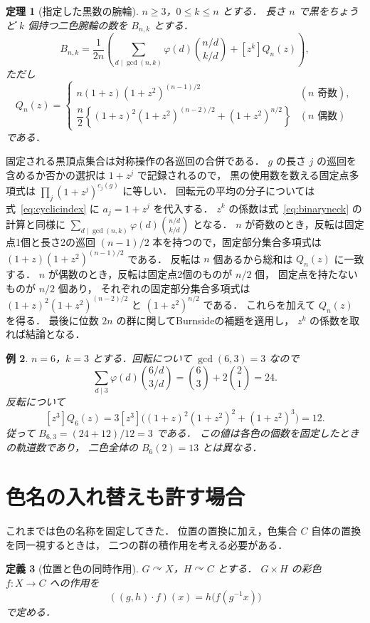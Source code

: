 \documentclass[a5paper,10pt,onecolumn]{jsarticle}
\makeatletter
\theoremstyle{mathnotetheorem}
\newtheorem{theorem}{定理}[section]
\newtheorem{definition}[theorem]{定義}
\newtheorem{example}[theorem]{例}
\renewcommand{\proofname}{証明}
\renewenvironment{proof}[1][\proofname]{%
  \par\pushQED{\qed}\normalfont\topsep4\p@\@plus2\p@\relax
  \trivlist\item[\hskip\labelsep\bfseries #1]\ignorespaces
}{\popQED\endtrivlist\@endpefalse}
\makeatother
\begin{document}
\begin{theorem}[指定した黒数の腕輪]\label{thm:fixedblackbracelet}
$n\ge3$，$0\le k\le n$ とする．
長さ $n$ で黒をちょうど $k$ 個持つ二色腕輪の数を $B_{n,k}$ とする．
\[
 B_{n,k}=\frac1{2n}\left(
 \sum_{d\mid\gcd(n,k)}\varphi(d){n/d\choose k/d}
 +[z^k]Q_n(z)\right),
\]
ただし
\[
 Q_n(z)=\begin{cases}
 n(1+z)(1+z^2)^{(n-1)/2}&(n\text{ 奇数}),\\
 \dfrac n2\left\{(1+z)^2(1+z^2)^{(n-2)/2}
 +(1+z^2)^{n/2}\right\}&(n\text{ 偶数})
 \end{cases}
\]
である．
\end{theorem}
\begin{proof}
固定される黒頂点集合は対称操作の各巡回の合併である．
$g$ の長さ $j$ の巡回を含めるか否かの選択は
$1+z^j$ で記録されるので，
黒の使用数を数える固定点多項式は
$\prod_j(1+z^j)^{c_j(g)}$ に等しい．
回転元の平均の分子については
式~\eqref{eq:cyclicindex} に $a_j=1+z^j$ を代入する．
$z^k$ の係数は式~\eqref{eq:binaryneck} の計算と同様に
$\sum_{d\mid\gcd(n,k)}\varphi(d){n/d\choose k/d}$ となる．
$n$ が奇数のとき，反転は固定点1個と長さ2の巡回
$(n-1)/2$ 本を持つので，固定部分集合多項式は
$(1+z)(1+z^2)^{(n-1)/2}$ である．
反転は $n$ 個あるから総和は $Q_n(z)$ に一致する．
$n$ が偶数のとき，反転は固定点2個のものが $n/2$ 個，
固定点を持たないものが $n/2$ 個あり，
それぞれの固定部分集合多項式は
$(1+z)^2(1+z^2)^{(n-2)/2}$ と
$(1+z^2)^{n/2}$ である．
これらを加えて $Q_n(z)$ を得る．
最後に位数 $2n$ の群に関してBurnsideの補題を適用し，
$z^k$ の係数を取れば結論となる．
\end{proof}

\begin{example}
$n=6$，$k=3$ とする．回転について
$\gcd(6,3)=3$ なので
\[
 \sum_{d\mid3}\varphi(d){6/d\choose3/d}
 ={6\choose3}+2{2\choose1}=24.
\]
反転について
\[
 [z^3]Q_6(z)
 =3[z^3]\bigl((1+z)^2(1+z^2)^2
 +(1+z^2)^3\bigr)=12.
\]
従って $B_{6,3}=(24+12)/12=3$ である．
この値は各色の個数を固定したときの軌道数であり，
二色全体の $B_6(2)=13$ とは異なる．
\end{example}

\section{色名の入れ替えも許す場合}
これまでは色の名称を固定してきた．
位置の置換に加え，色集合 $C$ 自体の置換を同一視するときは，
二つの群の積作用を考える必要がある．

\begin{definition}[位置と色の同時作用]
$G\curvearrowright X$，$H\curvearrowright C$ とする．
$G\times H$ の彩色 $f:X\to C$ への作用を
\[
 ((g,h)\cdot f)(x)=h\bigl(f(g^{-1}x)\bigr)
\]
で定める．
\end{definition}
\end{document}
